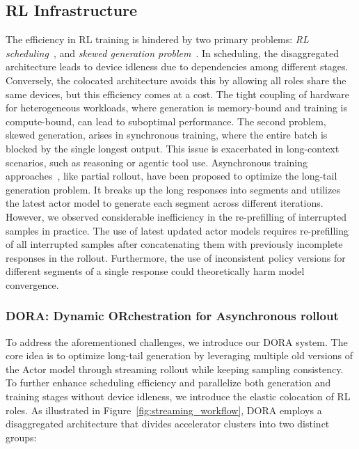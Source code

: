 \subsection{RL Infrastructure}
\label{subsec:rl_infra}
The efficiency in RL training is hindered by two primary problems: \textit{RL scheduling}~\citep{xiao2023adaptive, hu2024openrlhf,sheng2025hybridflow}, and \textit{skewed generation problem}~\citep{wu2025llamarl,zhong2025streamrl,seed2025seed1}.
In scheduling, the disaggregated architecture leads to device idleness due to dependencies among different stages.
Conversely, the colocated architecture avoids this by allowing all roles share the same devices, but this efficiency comes at a cost. The tight coupling of hardware for heterogeneous workloads, where generation is memory-bound and training is compute-bound, can lead to suboptimal performance.
The second problem, skewed generation, arises in synchronous training, where the entire batch is blocked by the single longest output. This issue is exacerbated in long-context scenarios, such as reasoning or agentic tool use. Asynchronous training approaches~\citep{team2025kimi,fu2025areal}, like partial rollout, have been proposed to optimize the long-tail generation problem. It breaks up the long responses into segments and utilizes the latest actor model to generate each segment across different iterations. However, we observed considerable inefficiency in the re-prefilling of interrupted samples in practice. The use of latest updated actor models requires re-prefilling of all interrupted samples after concatenating them with previously incomplete responses in the rollout. Furthermore, the use of inconsistent policy versions for different segments of a single response could theoretically harm model convergence.

\subsubsection{DORA: Dynamic ORchestration for Asynchronous rollout} 
To address the aforementioned challenges, we introduce our DORA system. The core idea is to optimize long-tail generation by leveraging multiple old versions of the Actor model through streaming rollout while keeping sampling consistency. To further enhance scheduling efficiency and parallelize both generation and training stages without device idleness, we introduce the elastic colocation of RL roles. As illustrated in Figure~\ref{fig:streaming_workflow}, DORA employs a disaggregated architecture that divides accelerator clusters into two distinct groups:


